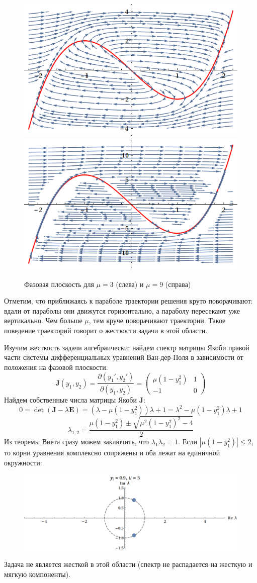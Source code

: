 \documentclass[12pt]{article}
\newcommand{\pd}[2]{\frac{\partial #1}{\partial #2}}
\renewcommand{\vec}[1]{\boldsymbol{\mathbf{#1}}}
\renewcommand{\leq}{\leqslant}
\begin{document}
\begin{figure}[ht!]
\centering
\includegraphics[width=.5\textwidth]{vdp.png}%
\includegraphics[width=.5\textwidth]{vdp9.png}%
\caption{Фазовая плоскость для $\mu = 3$ (слева) и $\mu = 9$ (справа)}
\end{figure}

Отметим, что приближаясь к параболе траектории решения круто поворачивают: вдали от параболы они движутся горизонтально, а параболу пересекают уже вертикально. Чем больше $\mu$, тем круче поворачивают траектории. Такое поведение траекторий говорит о жесткости задачи в этой области.

Изучим жесткость задачи алгебраически: найдем спектр матрицы Якоби правой части системы дифференциальных уравнений Ван-дер-Поля в зависимости от положения на фазовой плоскости.
\[
\vec J(y_1, y_2) = \pd{(y_1', y_2')}{(y_1, y_2)} = 
\begin{pmatrix}
\mu (1 - y_1^2) & 1\\
-1 & 0
\end{pmatrix}
\]
Найдем собственные числа матрицы Якоби $\vec J$:
\[
0 = \det (\vec J - \lambda \vec E) = (\lambda - \mu (1 - y_1^2) ) \lambda + 1 = 
\lambda^2 - \mu (1 - y_1^2) \lambda + 1
\]
\[
\lambda_{1,2} = \frac{\mu(1 - y_1^2) \pm \sqrt{\mu^2 (1 - y_1^2)^2 - 4}}{2}
\]
Из теоремы Виета сразу можем заключить, что $\lambda_1 \lambda_2 = 1$. Если $|\mu (1 - y_1^2)| \leq 2$, то корни уравнения комплексно сопряжены и оба лежат на единичной окружности:
\begin{figure}[ht!]
\centering
\includegraphics[width=\textwidth]{lamcc.png}
\end{figure}
Задача не является жесткой в этой области (спектр не распадается на жесткую и мягкую компоненты).
\end{document}
